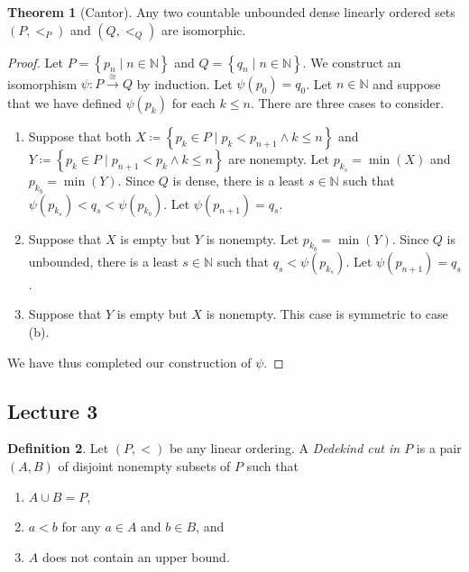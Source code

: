 \documentclass[10pt,letterpaper,cm]{nupset}
\theoremstyle{definition}
\newtheorem{definition}{Definition}[subsection]
\theoremstyle{theorem}
\newtheorem{theorem}[definition]{Theorem}
\theoremstyle{remark}
\newcommand{\N}{\mathbb N}
\newcommand{\1}{\mathbf{1}}
\newcommand{\0}{\vec 0}
\begin{document}
\smallskip

\begin{theorem}[Cantor]
 Any two countable unbounded dense linearly ordered sets $\left(P, <_P\right)$ and $\left(Q, <_Q\right)$ are isomorphic. 
\end{theorem}
\begin{proof} 
Let $P = \left\{p_n \mid n \in \N\right\}$ and $Q = \left\{q_n \mid n\in \N\right\}$. We construct an isomorphism $\psi : P \overset{\cong}{\longrightarrow} Q$ by induction. Let $\psi(p_0)= q_0$. Let $n\in \N$ and suppose that we have defined $\psi(p_k)$ for each $k\leq n$. There are three cases to consider.
\begin{enumerate}[label=(\alph*)]
\item Suppose that both $X\coloneqq \left\{ p_k \in P \mid p_k < p_{n+1} \land k \leq n\right\}$ and $Y \coloneqq \left\{ p_k \in P \mid p_{n+1} < p_k \land k \leq n\right\}$  are nonempty. Let $p_{k_s} = \min(X)$ and $p_{k_b} = \min(Y)$. Since $Q$ is dense, there is a least $s\in \N$ such that $\psi(p_{k_s}) < q_s < \psi(p_{k_b})$. Let $\psi(p_{n+1}) = q_s$. 
\item Suppose that $X$ is empty but $Y$ is nonempty. Let $p_{k_b} = \min(Y)$. Since $Q$ is unbounded, there is a least $s\in \N$ such that $q_s < \psi(p_{k_s})$. Let $\psi(p_{n+1}) = q_s$. 
\item Suppose that  $Y$ is empty but $X$ is nonempty. This case is symmetric to case (b).
\end{enumerate}
We have thus completed our construction of $\psi$.
\end{proof}

\subsection{Lecture 3}

\begin{definition}
Let  $\left(P, <\right)$ be any linear ordering. A \textit{Dedekind cut in $P$} is a pair $\left(A, B\right)$ of disjoint nonempty subsets of $P$ such that
\begin{enumerate}[label=(\alph*)]
\item $A \cup B = P$,
\item $a<b$ for any $a\in A$ and $b \in B$, and
\item $A$ does not contain an upper bound.
\end{enumerate}
\end{definition}
\end{document}
